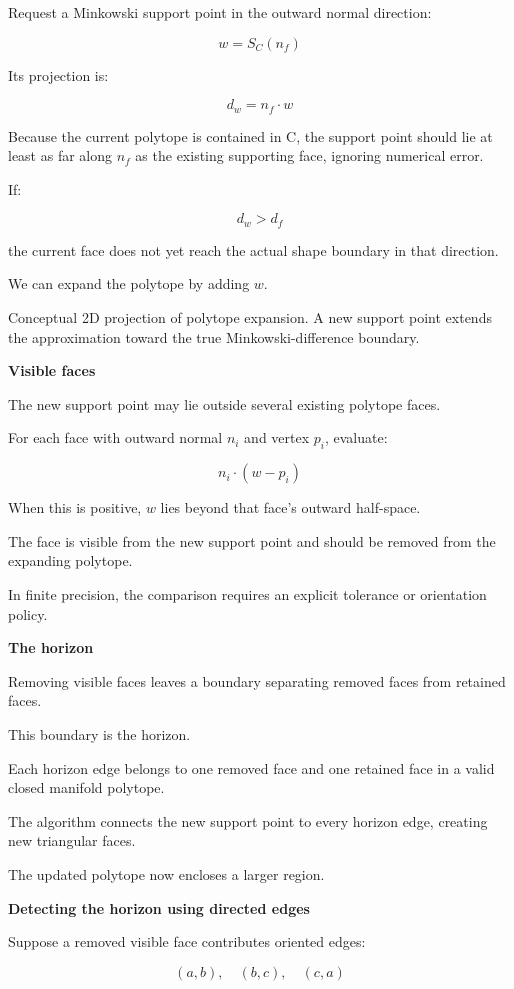 Request a Minkowski support point in the outward normal direction:

\[
\boxed{ w=S_C(n_f) }
\]

Its projection is:

\[
\boxed{ d_w=n_f\cdot w }
\]

Because the current polytope is contained in C, the support point should lie at least as far along \(n_f\) as the existing supporting face, ignoring numerical error.

If:

\[
d_w>d_f
\]

the current face does not yet reach the actual shape boundary in that direction.

We can expand the polytope by adding \(w\).

Conceptual 2D projection of polytope expansion. A new support point extends the approximation toward the true Minkowski-difference boundary.

\textbf{Visible faces}

The new support point may lie outside several existing polytope faces.

For each face with outward normal \(n_i\) and vertex \(p_i\), evaluate:

\[
\boxed{ n_i\cdot(w-p_i) }
\]

When this is positive, \(w\) lies beyond that face's outward half-space.

The face is visible from the new support point and should be removed from the expanding polytope.

In finite precision, the comparison requires an explicit tolerance or orientation policy.

\textbf{The horizon}

Removing visible faces leaves a boundary separating removed faces from retained faces.

This boundary is the horizon.

Each horizon edge belongs to one removed face and one retained face in a valid closed manifold polytope.

The algorithm connects the new support point to every horizon edge, creating new triangular faces.

The updated polytope now encloses a larger region.

\textbf{Detecting the horizon using directed edges}

Suppose a removed visible face contributes oriented edges:

\[
(a,b),\quad(b,c),\quad(c,a)
\]

